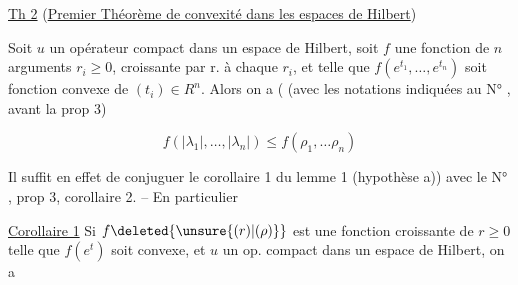  \uline{Th 2} (\uline{Premier Théorème de convexité dans les espaces de Hilbert})

 Soit $u$ un opérateur compact dans un espace de Hilbert, soit  $f$ une fonction  de $n$ arguments $r_i\geq0$, croissante par r. à chaque $r_i$, et telle que $f(e^{t_1},\ldots,e^{t_n})$ soit fonction convexe de $(t_i)\in R^n$. Alors on a ( (avec les notations indiquées au N° , avant la prop 3)

\[
f(|\lambda_1|,\ldots,|\lambda_n|)\leq f(\rho_1,\ldots\rho_n)\tag*{(17)}
\]

Il suffit en effet de conjuguer le corollaire 1 du lemme 1  (hypothèse a)) avec le N° , prop 3, corollaire 2. -- En particulier

\uline{Corollaire 1} Si $f\deleted{\unsure{(r)|(\rho)}}$ est une fonction  croissante de $r\geq0$ telle que $f(e^t)$ soit convexe, et $u$ un op. compact dans un espace de Hilbert, on a

